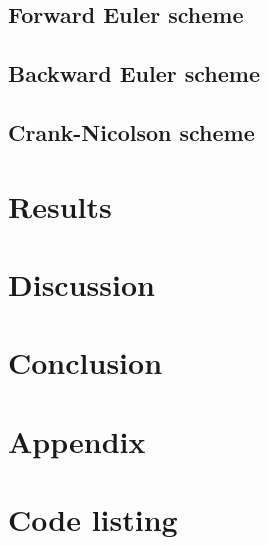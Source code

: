 \documentclass[a4paper, 11pt, notitlepage,english]{article}
\begin{document}
\subsection{Forward Euler scheme}
\subsection{Backward Euler scheme}
\subsection{Crank-Nicolson scheme}

\section{Results}

\section{Discussion}

\section{Conclusion}

\section{Appendix}



\section*{Code listing}


 
 
\end{document}
